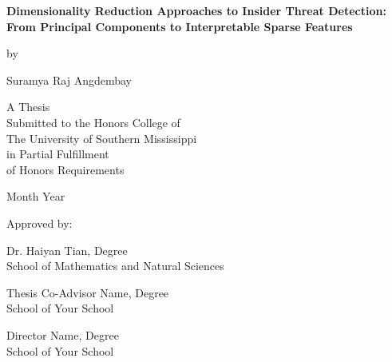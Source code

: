 \documentclass[12pt]{report}
\begin{document}

\begin{titlepage}
\centering

\vspace*{1in}

{\Large \textbf{Dimensionality Reduction Approaches to Insider Threat Detection: From Principal Components to Interpretable Sparse Features}}

\vspace{1.5in}

by

\vspace{1in}

Suramya Raj Angdembay

\vfill

A Thesis\\
Submitted to the Honors College of\\
The University of Southern Mississippi\\
in Partial Fulfillment\\
of Honors Requirements

\vspace{1in}

Month Year

\end{titlepage}


\begin{center}
Approved by:
\end{center}

\vspace{1in}

\noindent
Dr. Haiyan Tian, Degree\\
School of Mathematics and Natural Sciences

\vspace{0.8in}

\noindent
Thesis Co-Advisor Name, Degree\\
School of Your School

\vspace{0.8in}

\noindent
Director Name, Degree\\
School of Your School
\end{document}
